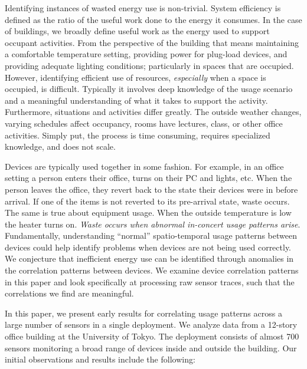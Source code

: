 
Identifying instances of wasted energy use is non-trivial.  System efficiency is defined as the ratio of the 
useful work done to the energy it consumes.  In the case of buildings, we broadly define useful work as 
the energy used to support occupant activities.  From the perspective of the building that means maintaining
a comfortable temperature setting, providing power for plug-load devices, and providing adequate lighting
conditions; particularly in spaces that are occupied.  However, identifying efficient use of resources,
\emph{especially} when a space is occupied, is difficult.  Typically it involves deep knowledge of the usage scenario and
a meaningful understanding of what it takes to support the activity.  Furthermore, situations and activities differ
greatly.  The outside weather changes, varying schedules affect occupancy, rooms have lectures, class,
or other office activities.  Simply put, the process is time consuming, requires specialized knowledge,
and does not scale.

Devices are typically used together in some fashion.  For example, in an office
setting a person enters their office, turns on their PC and lights, etc.
When the person leaves the office, they revert back to the state their devices were in before arrival.
If one of the items is not reverted to its pre-arrival state, waste occurs. 
The same is true about equipment usage.  When the outside temperature is low the heater turns on.
\emph{Waste occurs when abnormal in-concert usage patterns arise}.  
Fundamentally, understanding ``normal'' spatio-temporal usage patterns between devices could help
identify problems when devices are not being used correctly.
We conjecture that inefficient energy use can be identified through anomalies in the correlation
patterns between devices.  We examine device correlation patterns in this paper and look specifically
at processing raw sensor traces, such that the correlations we find are meaningful.

In this paper, we present early results for correlating usage patterns across a large number of sensors
in a single deployment.  We analyze data from a 12-story office building at the University of Tokyo.  
The deployment consists of almost 700 sensors monitoring a broad range of devices inside and outside 
the building.  Our initial observations and results include the following:

